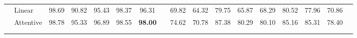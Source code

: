 \begin{tabular}{>{\centering\arraybackslash}p{0.7cm} p{1.5cm} | ccccc | >{\centering\arraybackslash}p{0.8cm} !{\vrule width 1.3pt} cccccccc | >{\centering\arraybackslash}p{0.8cm}}
{{    }}                                   & {Linear}                                 & 98.69                                            & 90.82                                    & 95.43                                    & 98.37                                    & 96.31                                         &                         & 69.82                                    & 64.32                                    & 79.75                                    & 65.87                                    & 68.29                                    & 80.52                                    & 77.96                                    & 70.86                                         &             \\
                                         & {Attentive}                              & 98.78                                            & 95.33                                    & 96.89                                    & 98.55                                    & \textbf{98.00}                                &                          & 74.62                                    & 70.78                                    & 87.38                                    & 80.29                                    & 80.10                                    & 85.16                                    & 85.31                                    & 78.40                                         &              \\
    \midrule
     \vspace{0.5mm}                                                                                                                                                                                                                                                                                                                                                                                                                                                                                                                                                                                                                                                                            \\
\end{tabular}
